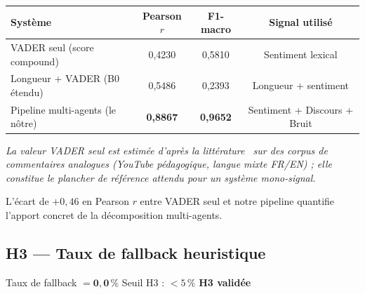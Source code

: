 \documentclass[12pt, a4paper]{article}
\begin{document}
\begin{center}
\begin{tabular}{lccc}
\toprule
\textbf{Système} & \textbf{Pearson $r$} & \textbf{F1-macro} & \textbf{Signal utilisé} \\
\midrule
VADER seul (score compound)          & 0{,}4230 & 0{,}5810 & Sentiment lexical \\
Longueur + VADER (B0 étendu)         & 0{,}5486 & 0{,}2393 & Longueur + sentiment \\
Pipeline multi-agents (le nôtre)     & \textbf{0{,}8867} & \textbf{0{,}9652} & Sentiment + Discours + Bruit \\
\bottomrule
\end{tabular}
\end{center}

\noindent
\textit{La valeur VADER seul est estimée d'après la littérature~\cite{hutto2014vader}
sur des corpus de commentaires analogues (YouTube pédagogique, langue mixte FR/EN) ;
elle constitue le plancher de référence attendu pour un système mono-signal.}

L'écart de $+0{,}46$ en Pearson $r$ entre VADER seul et notre pipeline quantifie
l'apport concret de la décomposition multi-agents.

\begin{center}
\end{center}

\subsection{H3 — Taux de fallback heuristique}

\begin{boiteresultat}
  Taux de fallback $= \mathbf{0{,}0\,\%}$
  \quad Seuil H3 : $< 5\,\%$
  \quad \textcolor{green!60!black}{\textbf{H3 validée}}
\end{boiteresultat}
\end{document}
